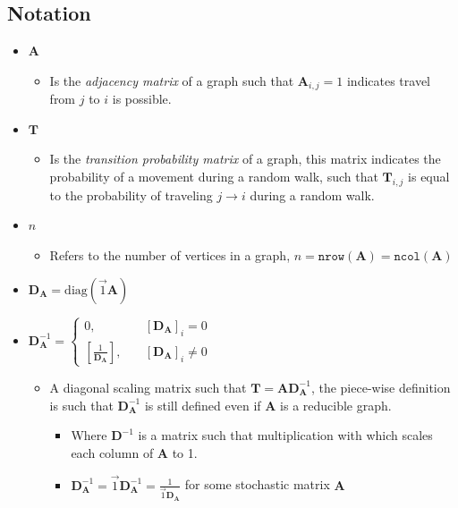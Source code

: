 \documentclass[11pt]{report}
\begin{document}
\subsection{Notation}
\label{notation}
\begin{itemize}
\item \(\mathbf{A}\)
\begin{itemize}
\item Is the \emph{adjacency matrix} of a graph such that \(\mathbf{A}_{i,j} = 1\) indicates travel from \(j\) to \(i\) is possible.
\end{itemize}
\item \(\mathbf{T}\)
\begin{itemize}
\item Is the \emph{transition probability matrix} of a graph, this matrix indicates the probability of a movement during a random walk, such that \(\mathbf{T}_{i,j}\) is equal to the probability of traveling \(j \rightarrow  i\) during a random walk.
\end{itemize}
\item \(n\)
\begin{itemize}
\item Refers to the number of vertices in a graph, \(n = \mathtt{nrow}\left(\mathbf{A}\right) = \mathtt{ncol}\left(\mathbf{A}\right)\)
\end{itemize}
\item \(\mathbf{D}_{\mathbf{A}}=\mathrm{diag}\left(\vec{1}\mathbf{A}\right)\)
\item \(\mathbf{D}_{\mathbf{A}}^{- 1}  =
   \begin{cases}
   0 ,& \quad \left[ \mathbf{D}_{\mathbf{A}} \right]_i = 0 \\
   \left[ \frac{1}{\mathbf{D}_{\mathbf{A}}} \right] ,& \enspace \enspace \left[ \mathbf{D}_{\mathbf{A}} \right]_i \neq 0
   \end{cases}\)
\begin{itemize}
\item A diagonal scaling matrix such that \(\mathbf{T} = \mathbf{A} \mathbf{D}_{\mathbf{A}}^{-1}\), the piece-wise definition is such that \(\mathbf{D}^{-1}_{\mathbf{A}}\) is still defined even if \(\mathbf{A}\) is a reducible graph.
\begin{itemize}
\item Where \(\mathbf{D}^{-1}\) is a matrix such that multiplication with which scales each column of \(\mathbf{A}\) to 1.
\item \(\mathbf{D}^{-1}_{\mathbf{A}} = \vec{1}\mathbf{D}^{-1}_{\mathbf{A}} = \frac{1}{\vec{1}\mathbf{D}_{\mathbf{A}}}\) for some stochastic matrix \(\mathbf{A}\)

\end{itemize}
\end{itemize}
\end{itemize}
\end{document}
